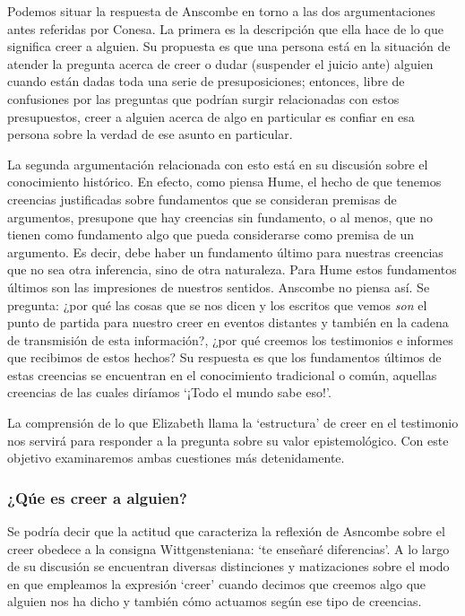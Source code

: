 Podemos situar la respuesta de Anscombe en torno a las dos argumentaciones antes referidas por Conesa. La primera es la descripción que ella hace de lo que significa creer a alguien. Su propuesta es que una persona está en la situación de atender la pregunta acerca de creer o dudar (suspender el juicio ante) alguien cuando están dadas toda una serie de presuposiciones; entonces, libre de confusiones por las preguntas que podrían surgir relacionadas con estos presupuestos, creer a alguien acerca de algo en particular es confiar en esa persona sobre la verdad de ese asunto en particular.

La segunda argumentación relacionada con esto está en su discusión sobre el conocimiento histórico. En efecto, como piensa Hume, el hecho de que tenemos creencias justificadas sobre fundamentos que se consideran premisas de argumentos, presupone que hay creencias sin fundamento, o al menos, que no tienen como fundamento algo que pueda considerarse como premisa de un argumento. Es decir, debe haber un fundamento último para nuestras creencias que no sea otra inferencia, sino de otra naturaleza. Para Hume estos fundamentos últimos son las impresiones de nuestros sentidos. Anscombe no piensa así. Se pregunta: ¿por qué las cosas que se nos dicen y los escritos que vemos \emph{son} el punto de partida para nuestro creer en eventos distantes y también en la cadena de transmisión de esta información?, ¿por qué creemos los testimonios e informes que recibimos de estos hechos? Su respuesta es que los fundamentos últimos de estas creencias se encuentran en el conocimiento tradicional o común, aquellas creencias de las cuales diríamos \enquote*{¡Todo el mundo sabe eso!}.

La comprensión de lo que Elizabeth llama la `estructura' de creer en el testimonio nos servirá para responder a la pregunta sobre su valor epistemológico. Con este objetivo examinaremos ambas cuestiones más detenidamente.

\subsubsection{¿Qúe es creer a alguien?}

Se podría decir que la actitud que caracteriza la reflexión de Asncombe sobre el creer obedece a la consigna Wittgensteniana: \enquote*{te enseñaré diferencias}. A lo largo de su discusión se encuentran diversas distinciones y matizaciones sobre el modo en que empleamos la expresión `creer' cuando decimos que creemos algo que alguien nos ha dicho y también cómo actuamos según ese tipo de creencias.

